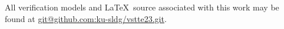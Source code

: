 \documentclass[runningheads]{llncs}
\begin{document}
\medskip

\noindent All verification models and \LaTeX\ source associated with
this work may be found at \url{git@github.com:ku-sldg/vstte23.git}.

% 
% 
%
%
%

%

%
\end{document}
